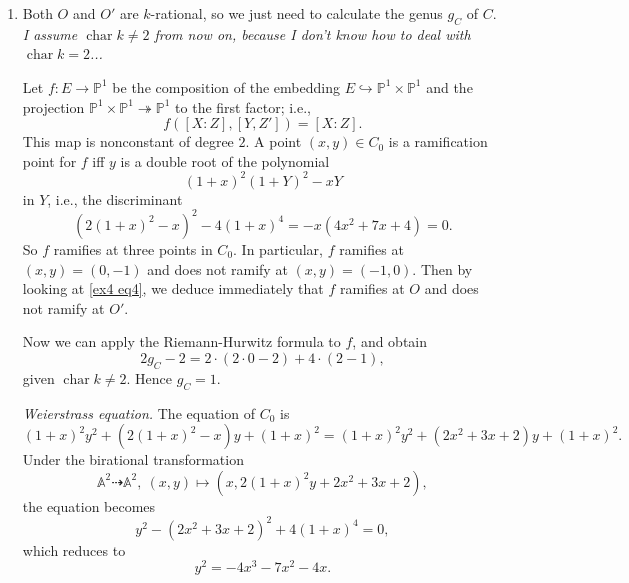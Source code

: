 \documentclass{article}
\theoremstyle{definition}
\theoremstyle{remark}
\renewcommand{\P}{\mathbb{P}}
\newcommand{\A}{\mathbb{A}}
\DeclareMathOperator{\cha}{char} %
\begin{document}
\begin{enumerate}
\item Both $O$ and $O'$ are $k$-rational, so we just need to calculate the genus $g_C$ of $C$.
\textit{I assume $\cha k\ne 2$ from now on, because I don't know how to deal with $\cha k = 2$...}

Let $f : E\to \P^1$ be the composition of the embedding $E\hookrightarrow \P^1\times\P^1$ and the projection $\P^1\times\P^1\twoheadrightarrow\P^1$ to the first factor; i.e.,
\[f([X : Z], [Y, Z']) = [X : Z].\]
This map is nonconstant of degree $2$.
A point $(x, y)\in C_0$ is a ramification point for $f$ iff $y$ is a double root of the polynomial \[(1+x)^2(1+Y)^2-xY\] in $Y$, i.e., the discriminant \[(2(1+x)^2 - x)^2 - 4(1+x)^4 = -x(4x^2 + 7x + 4) = 0.\] So $f$ ramifies at three points in $C_0$. In particular, $f$ ramifies at $(x, y) = (0, -1)$ and does not ramify at $(x, y) = (-1, 0)$. Then by looking at \cref{ex4 eq4}, we deduce immediately that $f$ ramifies at $O$ and does not ramify at $O'$.

Now we can apply the Riemann-Hurwitz formula to $f$, and obtain \[2g_C - 2 = 2\cdot (2\cdot 0 - 2) + 4\cdot (2 - 1),\]
given $\cha k \ne 2$. Hence $g_C = 1$.

\textit{Weierstrass equation.}
The equation of $C_0$ is \[(1+x)^2y^2 + (2(1+x)^2 - x)y + (1+x)^2 = (1+x)^2y^2 + (2x^2+3x+2) y + (1+x)^2.\]
Under the birational transformation
\[\A^2\dashrightarrow \A^2,\ (x, y) \mapsto (x, 2(1+x)^2y + 2x^2 + 3x+2),\]
the equation becomes \[y^2 - (2x^2+3x+2)^2 + 4(1 + x)^4 = 0,\]
which reduces to \[y^2 = -4x^3 - 7x^2 - 4x.\]



\end{enumerate}
\end{document}
